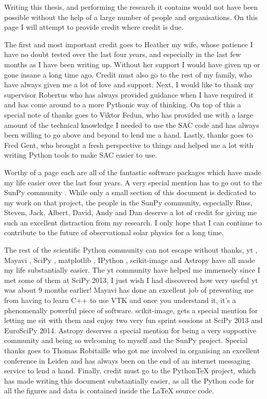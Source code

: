 \documentclass[a4paper,12pt,fourier,authoryear,custommargin]{Classes/PhDThesisPSnPDF}
\begin{document}
\begin{acknowledgements}      

Writing this thesis, and performing the research it contains would not have been possible without the help of a large number of people and organisations.
On this page I will attempt to provide credit where credit is due.

The first and most important credit goes to Heather my wife, whose patience I have no doubt tested over the last four years, and especially in the last few months as I have been writing up.
Without her support I would have given up or gone insane a long time ago.
Credit must also go to the rest of my family, who have always given me a lot of love and support.
Next, I would like to thank my supervisor Robertus who has always provided guidance when I have required it and has come around to a more Pythonic way of thinking.
On top of this a special note of thanks goes to Viktor Fedun, who has provided me with a large amount of the technical knowledge I needed to use the SAC code and has always been willing to go above and beyond to lend me a hand.
Lastly, thanks goes to Fred Gent, who brought a fresh perspective to things and helped me a lot with writing Python tools to make SAC easier to use.

Worthy of a page each are all of the fantastic software packages which have made my life easier over the last four years.
A very special mention has to go out to the SunPy community \citep{thesunpycommunity2015a}.
While only a small section of this document is dedicated to my work on that project, the people in the SunPy community, especially Russ, Steven, Jack, Albert, David, Andy and Dan deserve a lot of credit for giving me such an excellent distraction from my research.
I only hope that I can continue to contribute to the future of observational solar physics for a long time.

The rest of the scientific Python community can not escape without thanks, yt \citep{turk2011}, Mayavi \citep{ramachandran2011}, SciPy \citep{jones2001}, matplotlib \citep{hunter2007}, IPython \citep{perez2007}, scikit-image \citep{vanderwalt2014} and Astropy \citep{theastropycollaboration2013} have all made my life substantially easier.
The yt community have helped me immensely since I met some of them at SciPy 2013, I just wish I had discovered how very useful yt was about 9 months earlier!
Mayavi has done an excellent job of preventing me from having to learn C++ to use VTK and once you understand it, it's a phenomenally powerful piece of software.
scikit-image, gets a special mention for letting me sit with them and enjoy two very fun sprint sessions at SciPy 2013 and EuroSciPy 2014.
Astropy deserves a special mention for being a very supportive community and being so welcoming to myself and the SunPy project. Special thanks goes to Thomas Robitaille who got me involved in organising an excellent conference in Leiden and has always been on the end of an internet messaging service to lend a hand.
Finally, credit must go to the PythonTeX \citep{poore2015} project, which has made writing this document substantially easier, as all the Python code for all the figures and data is contained inside the LaTeX source code.


\end{acknowledgements}
\end{document}
